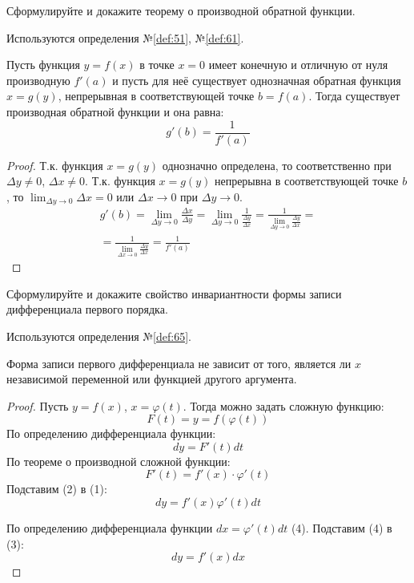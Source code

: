 \begin{question}
    Сформулируйте и докажите теорему о производной обратной функции.
\end{question}
\begin{used}
    Используются определения №\ref{def:51}, №\ref{def:61}.
\end{used}
\begin{theorem}
    Пусть функция $y = f(x)$ в точке $x = 0$ имеет конечную и отличную от нуля производную  $f'(a)$ и пусть для неё существует однозначная обратная функция $x = g(y)$, непрерывная в соответствующей точке $b = f(a)$.
    Тогда существует производная обратной функции и она равна:  \[
        g'(b) = \frac{1}{f'(a)}
    \] 
\end{theorem}
\begin{proof}
    Т.к. функция $x = g(y)$ однозначно определена, то соответственно при  $\Delta y \neq 0$, $\Delta x \neq 0$.
    Т.к. функция $x = g(y)$ непрерывна в соответствующей точке $b$, то  $\lim_{\Delta y \to 0} \Delta x = 0$ или $\Delta x \to 0$ при $\Delta y \to 0$.
    \begin{gather*}
        g'(b) = \lim_{\Delta y \to 0} \frac{\Delta x}{\Delta y} = \lim_{\Delta y \to 0} \frac{1}{\frac{\Delta y}{\Delta x}} = \frac{1}{\lim_{\Delta y \to 0} \frac{\Delta y}{\Delta x}} = \\
        = \frac{1}{\lim_{\Delta x \to 0} \frac{\Delta y}{\Delta x}} = \frac{1}{f'(a)}
    \end{gather*}
\end{proof}
\pagebreak



\begin{question}
    Сформулируйте и докажите свойство инвариантности формы записи дифференциала первого порядка.
\end{question}
\begin{used}
    Используются определения №\ref{def:65}.
\end{used}
\begin{theorem}
    Форма записи первого дифференциала не зависит от того, является ли $x$ независимой переменной или функцией другого аргумента.
\end{theorem}
\begin{proof}
    Пусть $y = f(x)$,  $x = \varphi(t)$. Тогда можно задать сложную функцию: \[
        F(t) = y = f(\varphi(t))
    \] 
    По определению дифференциала функции: \[
        dy = F'(t)dt \tag{1}
    \] 
    По теореме о производной сложной функции: \[
        F'(t) = f'(x) \cdot \varphi'(t) \tag{2}
    \] 
    Подставим (2) в (1): \[
        dy = f'(x) \varphi'(t) dt \tag{3} 
    \] 

    По определению дифференциала функции $dx = \varphi'(t)dt$ (4). Подставим (4) в (3): \[
        \boxed{dy = f'(x) dx}
    \] 
\end{proof}
\pagebreak



